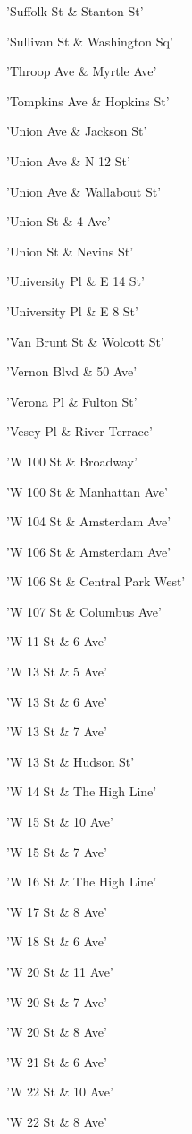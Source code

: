 \documentclass[11pt]{article}
\begin{document}
\begin{enumerate*}
\item 'Suffolk St \& Stanton St'
\item 'Sullivan St \& Washington Sq'
\item 'Throop Ave \& Myrtle Ave'
\item 'Tompkins Ave \& Hopkins St'
\item 'Union Ave \& Jackson St'
\item 'Union Ave \& N 12 St'
\item 'Union Ave \& Wallabout St'
\item 'Union St \& 4 Ave'
\item 'Union St \& Nevins St'
\item 'University Pl \& E 14 St'
\item 'University Pl \& E 8 St'
\item 'Van Brunt St \& Wolcott St'
\item 'Vernon Blvd \& 50 Ave'
\item 'Verona Pl \& Fulton St'
\item 'Vesey Pl \& River Terrace'
\item 'W 100 St \& Broadway'
\item 'W 100 St \& Manhattan Ave'
\item 'W 104 St \& Amsterdam Ave'
\item 'W 106 St \& Amsterdam Ave'
\item 'W 106 St \& Central Park West'
\item 'W 107 St \& Columbus Ave'
\item 'W 11 St \& 6 Ave'
\item 'W 13 St \& 5 Ave'
\item 'W 13 St \& 6 Ave'
\item 'W 13 St \& 7 Ave'
\item 'W 13 St \& Hudson St'
\item 'W 14 St \& The High Line'
\item 'W 15 St \& 10 Ave'
\item 'W 15 St \& 7 Ave'
\item 'W 16 St \& The High Line'
\item 'W 17 St \& 8 Ave'
\item 'W 18 St \& 6 Ave'
\item 'W 20 St \& 11 Ave'
\item 'W 20 St \& 7 Ave'
\item 'W 20 St \& 8 Ave'
\item 'W 21 St \& 6 Ave'
\item 'W 22 St \& 10 Ave'
\item 'W 22 St \& 8 Ave'

\end{enumerate*}
\end{document}
